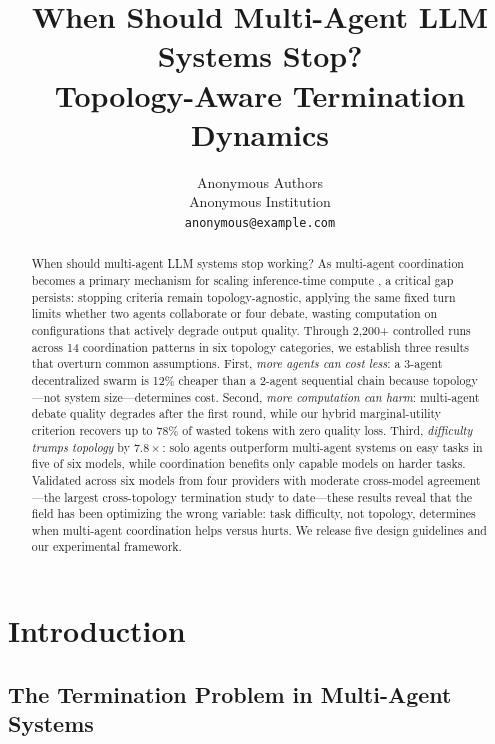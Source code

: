 \documentclass{article}
\title{When Should Multi-Agent LLM Systems Stop? \\ Topology-Aware Termination Dynamics}
\author{Anonymous Authors\\
Anonymous Institution\\
\texttt{anonymous@example.com}}
\begin{document}
\ifcolmsubmission
\linenumbers
\fi

\maketitle

\begin{abstract}
When should multi-agent LLM systems stop working? As multi-agent coordination becomes a primary mechanism for scaling inference-time compute \citep{snell2024scaling,du2024debate}, a critical gap persists: stopping criteria remain topology-agnostic, applying the same fixed turn limits whether two agents collaborate or four debate, wasting computation on configurations that actively degrade output quality. Through 2,200+ controlled runs across 14 coordination patterns in six topology categories, we establish three results that overturn common assumptions. First, \emph{more agents can cost less}: a 3-agent decentralized swarm is 12\% cheaper than a 2-agent sequential chain because topology---not system size---determines cost. Second, \emph{more computation can harm}: multi-agent debate quality degrades after the first round, while our hybrid marginal-utility criterion recovers up to 78\% of wasted tokens with zero quality loss. Third, \emph{difficulty trumps topology} by $7.8\times$: solo agents outperform multi-agent systems on easy tasks in five of six models, while coordination benefits only capable models on harder tasks. Validated across six models from four providers with moderate cross-model agreement---the largest cross-topology termination study to date---these results reveal that the field has been optimizing the wrong variable: task difficulty, not topology, determines when multi-agent coordination helps versus hurts. We release five design guidelines and our experimental framework.
\end{abstract}

\section{Introduction}
\label{sec:intro}

\subsection{The Termination Problem in Multi-Agent Systems}
\end{document}
